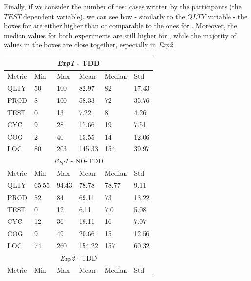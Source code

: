 Finally, if we consider the number of test cases written by the participants (\ie the $TEST$ dependent variable), we can see how - similarly to the $QLTY$ variable - the boxes for \tdd are either higher than or comparable to the ones for \notdd. Moreover, the median values for both experiments are still higher for \tdd, while the majority of values in the boxes are close together, especially in \textit{Exp2}.

\begin{table}[H]
    \begin{center} 
        \begin{tabular}{ |p{2cm}||p{1.6cm}|p{1.6cm}|p{1.6cm}|p{1.6cm}|p{1.6cm}|}
            \hline
                \multicolumn{6}{|c|}{\textit{Exp1} - TDD} \\
            \hline
                Metric & Min & Max & Mean & Median & Std\\
            \hline
                QLTY & 50 & 100 & 82.97 & 82 & 17.43 \\
                PROD & 8 & 100 & 58.33 & 72 & 35.76 \\
                TEST & 0 & 13 & 7.22 & 8 & 4.26 \\
                CYC & 9 & 28 & 17.66 & 19 & 7.51 \\
                COG & 2 & 40 & 15.55 & 14 & 12.06 \\
                LOC & 80 & 203 & 145.33 & 154 & 39.97 \\
            \hline\hline
                \multicolumn{6}{|c|}{\textit{Exp1} - NO-TDD} \\
            \hline
                Metric & Min & Max & Mean & Median & Std\\
            \hline
                QLTY & 65.55 & 94.43 & 78.78 & 78.77 & 9.11 \\
                PROD & 52 & 84 & 69.11 & 73 & 13.22 \\
                TEST & 0 & 12 & 6.11 & 7.0 & 5.08 \\
                CYC & 12 & 36 & 19.11 & 16 & 7.07 \\
                COG & 9 & 49 & 20.66 & 15 & 12.56 \\
                LOC & 74 & 260 & 154.22 & 157 & 60.32 \\
            \hline
            \hline
                \multicolumn{6}{|c|}{\textit{Exp2} - TDD} \\
            \hline
                Metric & Min & Max & Mean & Median & Std\\

\end{tabular}
\end{center}
\end{table}
